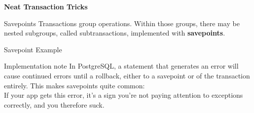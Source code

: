 \documentclass[svgnames]{beamer}
\begin{document}
\begin{frame}
    \begin{centering}
        \textbf{Neat Transaction Tricks}
        \par
    \end{centering}
\end{frame}

\begin{frame}{Savepoints}
    Transactions group operations. Within those groups, there may be nested
    subgroups, called subtransactions, implemented with \textbf{savepoints}.
\end{frame}

\begin{frame}{Savepoint Example}
\end{frame}

\begin{frame}{Implementation note}
    In PostgreSQL, a statement that generates an error will cause continued
    errors until a rollback, either to a savepoint or of the transaction
    entirely. This makes savepoints quite common: \\
    \vspace{10pt}
    \small{
    }
    \vspace{10pt}
    If your app gets this error, it's a sign you're not paying attention to
    exceptions correctly, and you therefore suck.
\end{frame}
\end{document}
